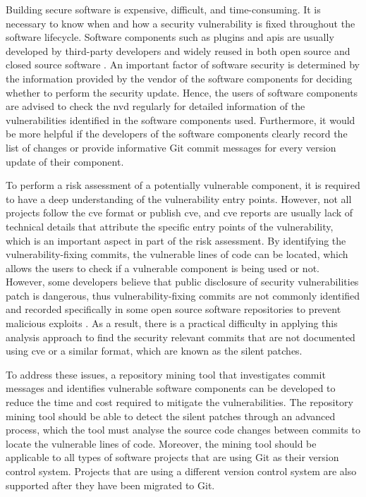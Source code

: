 \documentclass[12pt, a4paper]{report}
\begin{document}
Building secure software is expensive, difficult, and time-consuming. It is necessary to know when
and how a security vulnerability is fixed throughout the software lifecycle. Software components
such as plugins and \acrfull{apis} are usually developed by third-party developers and widely reused
in both open source and closed source software \cite{khan_2001}. An important factor of software
security is determined by the information provided by the vendor of the software components for
deciding whether to perform the security update. Hence, the users of software components are advised
to check the \acrfull{nvd} \cite{nvd} regularly for detailed information of the vulnerabilities
identified in the software components used. Furthermore, it would be more helpful if the developers
of the software components clearly record the list of changes or provide informative Git commit
messages for every version update of their component.

To perform a risk assessment of a potentially vulnerable component, it is required to have a deep
understanding of the vulnerability entry points. However, not all projects follow the \acrfull{cve}
format or publish \acrshort{cve}, and \acrshort{cve} reports are usually lack of technical details
that attribute the specific entry points of the vulnerability, which is an important aspect in part
of the risk assessment. By identifying the vulnerability-fixing commits, the vulnerable lines of
code can be located, which allows the users to check if a vulnerable component is being used or not.
However, some developers believe that public disclosure of security vulnerabilities patch is
dangerous, thus vulnerability-fixing commits are not commonly identified and recorded specifically
in some open source software repositories to prevent malicious exploits \cite{arora_2005}. As a
result, there is a practical difficulty in applying this analysis approach to find the security
relevant commits that are not documented using \acrshort{cve} or a similar format, which are known
as the silent patches.

To address these issues, a repository mining tool that investigates commit messages and identifies
vulnerable software components can be developed to reduce the time and cost required to mitigate the
vulnerabilities. The repository mining tool should be able to detect the silent patches through an
advanced process, which the tool must analyse the source code changes between commits to locate the
vulnerable lines of code. Moreover, the mining tool should be applicable to all types of software
projects that are using Git as their version control system. Projects that are using a different
version control system are also supported after they have been migrated to Git.
\end{document}
